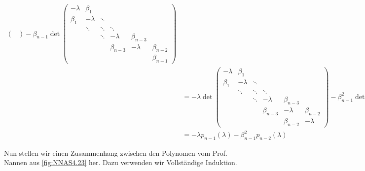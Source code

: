 \begin{solution}
\begin{itemize}
\begin{align*}
\begin{pmatrix}
    \end{pmatrix}
    -
    \beta_{n-1}
    \det
    \begin{pmatrix}
      -\lambda & \beta_1  &        &             &             &             \\
      \beta_1  & -\lambda & \ddots &             &             &             \\
              & \ddots   & \ddots & \ddots      &             &             \\
              &          & \ddots & -\lambda    & \beta_{n-3} &             \\
              &          &        & \beta_{n-3} & -\lambda    & \beta_{n-2} \\
              &          &        &             &             & \beta_{n-1}
    \end{pmatrix} \\
    & =
    -\lambda
    \det
    \begin{pmatrix}
      -\lambda & \beta_1  &        &             &             &             \\
      \beta_1  & -\lambda & \ddots &             &             &             \\
              & \ddots   & \ddots & \ddots      &             &             \\
              &          & \ddots & -\lambda    & \beta_{n-3} &             \\
              &          &        & \beta_{n-3} & -\lambda    & \beta_{n-2} \\
              &          &        &             & \beta_{n-2} & -\lambda
    \end{pmatrix}
    -
    \beta_{n-1}^2
    \det
    \begin{pmatrix}
      -\lambda & \beta_1  &        &             &             \\
      \beta_1  & -\lambda & \ddots &             &             \\
              & \ddots   & \ddots & \ddots      &             \\
              &          & \ddots & -\lambda    & \beta_{n-3} \\
              &          &        & \beta_{n-3} & -\lambda
    \end{pmatrix} \\
    & =
    -\lambda p_{n-1}(\lambda) - \beta_{n-1}^2 p_{n-2}(\lambda)
  \end{align*}

  Nun stellen wir einen Zusammenhang zwischen den Polynomen vom Prof. Nannen aus \ref{fig:NNAS4.23} her.
  Dazu verwenden wir Vollständige Induktion.


\end{itemize}
\end{solution}
